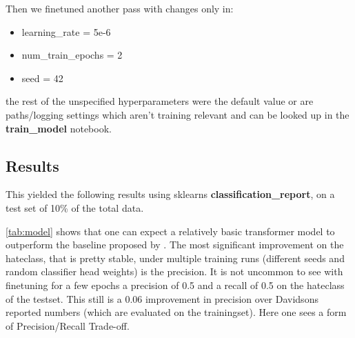 \documentclass[11pt,a4paper]{article}
\begin{document}
Then we finetuned another pass with changes only in:

\begin{itemize}
    \setlength{\itemsep}{0.5pt}
    \item learning\_rate = 5e-6
    \item num\_train\_epochs = 2
    \item seed = 42
\end{itemize}
the rest of the unspecified hyperparameters were the default value or are paths/logging settings which aren't training
relevant and can be looked up in the \textbf{train\_model} notebook.

\subsection{Results}
This yielded the following results using sklearns \textbf{classification\_report}, on a test set of 10\%
of the total data.

\begin{table}
\caption{Classification report for our finetuned model without external features}

\label{tab:model}
\end{table}

\ref{tab:model} shows that one can expect a relatively basic transformer model to outperform the baseline proposed by \cite{auto_hatespeech}.
The most significant improvement on the hateclass, that is pretty stable, under multiple training runs (different seeds and random classifier head weights)
is the precision. It is not uncommon to see with finetuning for a few epochs a precision of 0.5 and a recall of 0.5 on the hateclass of the testset.
This still is a 0.06 improvement in precision over Davidsons reported numbers (which are evaluated on the trainingset).
Here one sees a form of Precision/Recall Trade-off.
\end{document}

